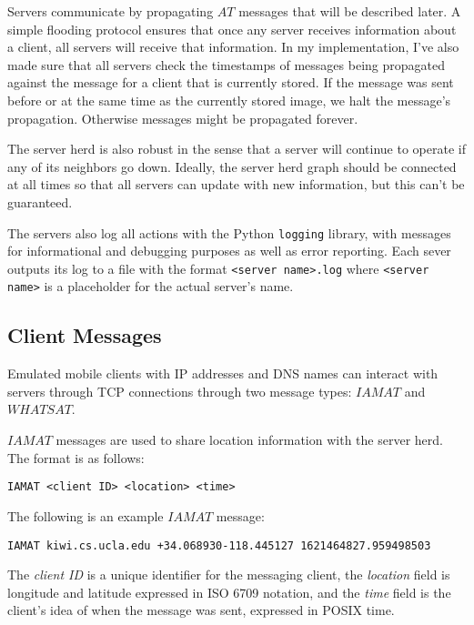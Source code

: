 Servers communicate by propagating $AT$ messages that will be described later. A simple flooding protocol ensures that once any server receives information about a client, all servers will receive that information. In my implementation, I've also made sure that all servers check the timestamps of messages being propagated against the message for a client that is currently stored. If the message was sent before or at the same time as the currently stored image, we halt the message's propagation. Otherwise messages might be propagated forever.

The server herd is also robust in the sense that a server will continue to operate if any of its neighbors go down. Ideally, the server herd graph should be connected at all times so that all servers can update with new information, but this can't be guaranteed.

The servers also log all actions with the Python \texttt{logging} library, with messages for informational and debugging purposes as well as error reporting. Each sever outputs its log to a file with the format \texttt{<server name>.log} where \texttt{<server name>} is a placeholder for the actual server's name.

\subsection{Client Messages}
Emulated mobile clients with IP addresses and DNS names can interact with servers through TCP connections through two message types: $IAMAT$ and $WHATSAT$.

$IAMAT$ messages are used to share location information with the server herd. The format is as follows:
\begin{center}
  \texttt{IAMAT <client ID> <location> <time>}
\end{center}
The following is an example $IAMAT$ message:
\begin{center}
  \texttt{IAMAT kiwi.cs.ucla.edu +34.068930-118.445127 1621464827.959498503}
\end{center}
The \textit{client ID} is a unique identifier for the messaging client, the \textit{location} field is longitude and latitude expressed in ISO 6709 notation, and the \textit{time} field is the client's idea of when the message was sent, expressed in POSIX time.

